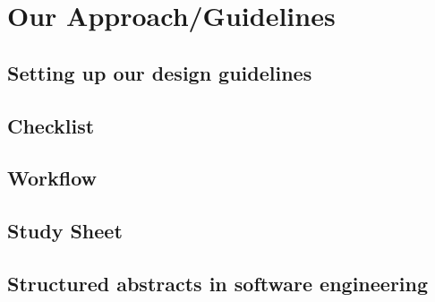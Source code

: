 
\section{Our Approach/Guidelines}

\subsection{Setting up our design guidelines}



\newpage
\subsection{Checklist}

\newpage
\subsection{Workflow}





%


\subsection{Study Sheet}



\newpage
\subsection{Structured abstracts in software engineering}







